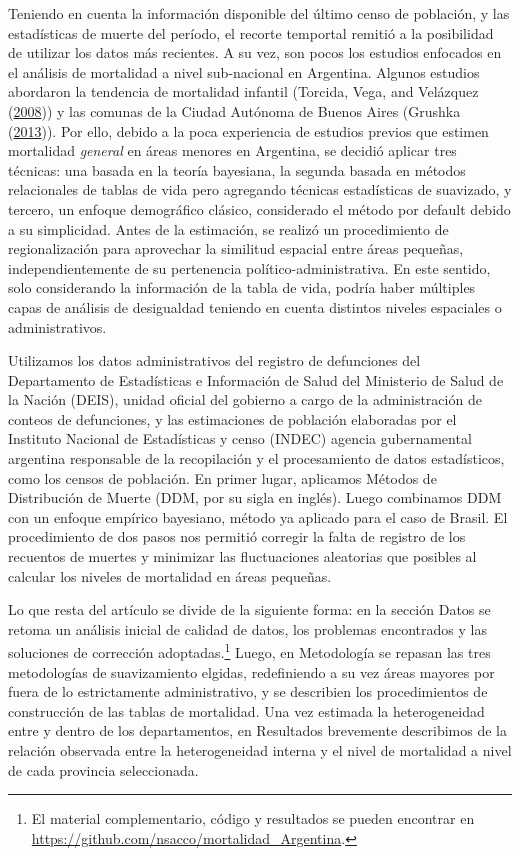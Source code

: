 \documentclass[12pt,]{article}
\begin{document}
Teniendo en cuenta la información disponible del último censo de
población, y las estadísticas de muerte del período, el recorte
temportal remitió a la posibilidad de utilizar los datos más recientes.
A su vez, son pocos los estudios enfocados en el análisis de mortalidad
a nivel sub-nacional en Argentina. Algunos estudios abordaron la
tendencia de mortalidad infantil (Torcida, Vega, and Velázquez
(\protect\hyperlink{ref-torcida2008}{2008})) y las comunas de la Ciudad
Autónoma de Buenos Aires (Grushka
(\protect\hyperlink{ref-Grushka2013}{2013})). Por ello, debido a la poca
experiencia de estudios previos que estimen mortalidad \emph{general} en
áreas menores en Argentina, se decidió aplicar tres técnicas: una basada
en la teoría bayesiana, la segunda basada en métodos relacionales de
tablas de vida pero agregando técnicas estadísticas de suavizado, y
tercero, un enfoque demográfico clásico, considerado el método por
default debido a su simplicidad. Antes de la estimación, se realizó un
procedimiento de regionalización para aprovechar la similitud espacial
entre áreas pequeñas, independientemente de su pertenencia
político-administrativa. En este sentido, solo considerando la
información de la tabla de vida, podría haber múltiples capas de
análisis de desigualdad teniendo en cuenta distintos niveles espaciales
o administrativos.

Utilizamos los datos administrativos del registro de defunciones del
Departamento de Estadísticas e Información de Salud del Ministerio de
Salud de la Nación (DEIS), unidad oficial del gobierno a cargo de la
administración de conteos de defunciones, y las estimaciones de
población elaboradas por el Instituto Nacional de Estadísticas y censo
(INDEC) agencia gubernamental argentina responsable de la recopilación y
el procesamiento de datos estadísticos, como los censos de población. En
primer lugar, aplicamos Métodos de Distribución de Muerte (DDM, por su
sigla en inglés). Luego combinamos DDM con un enfoque empírico
bayesiano, método ya aplicado para el caso de Brasil. El procedimiento
de dos pasos nos permitió corregir la falta de registro de los recuentos
de muertes y minimizar las fluctuaciones aleatorias que posibles al
calcular los niveles de mortalidad en áreas pequeñas.

Lo que resta del artículo se divide de la siguiente forma: en la sección
Datos se retoma un análisis inicial de calidad de datos, los problemas
encontrados y las soluciones de corrección adoptadas.\footnote{El
  material complementario, código y resultados se pueden encontrar en
  \url{https://github.com/nsacco/mortalidad_Argentina}.} Luego, en
Metodología se repasan las tres metodologías de suavizamiento elgidas,
redefiniendo a su vez áreas mayores por fuera de lo estrictamente
administrativo, y se describien los procedimientos de construcción de
las tablas de mortalidad. Una vez estimada la heterogeneidad entre y
dentro de los departamentos, en Resultados brevemente describimos de la
relación observada entre la heterogeneidad interna y el nivel de
mortalidad a nivel de cada provincia seleccionada.
\end{document}
